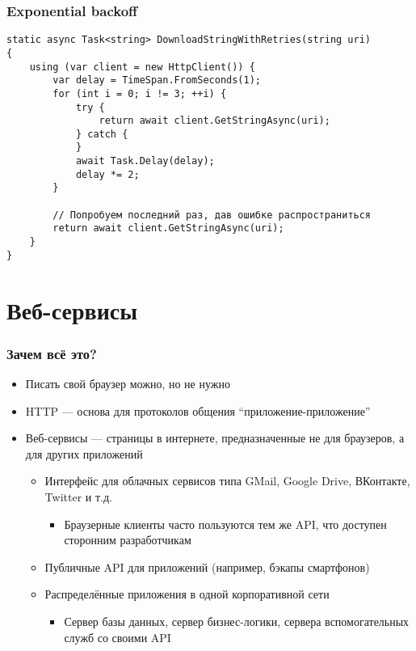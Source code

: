 \documentclass{../../slides-style}
\begin{document}
    \begin{frame}[fragile]
        \frametitle{Exponential backoff}
        \begin{footnotesize}
            \begin{verbatim}
static async Task<string> DownloadStringWithRetries(string uri)
{
    using (var client = new HttpClient()) {
        var delay = TimeSpan.FromSeconds(1);
        for (int i = 0; i != 3; ++i) {
            try {
                return await client.GetStringAsync(uri);
            } catch {
            }
            await Task.Delay(delay);
            delay *= 2;
        }

        // Попробуем последний раз, дав ошибке распространиться
        return await client.GetStringAsync(uri);
    }
}
            \end{verbatim}
        \end{footnotesize}
    \end{frame}

    \section{Веб-сервисы}

    \begin{frame}
        \frametitle{Зачем всё это?}
        \begin{itemize}
            \item Писать свой браузер можно, но не нужно
            \item HTTP --- основа для протоколов общения \enquote{приложение-приложение}
            \item Веб-сервисы --- страницы в интернете, предназначенные не для браузеров, а для других приложений
            \begin{itemize}
                \item Интерфейс для облачных сервисов типа GMail, Google Drive, ВКонтакте, Twitter и т.д.
                \begin{itemize}
                    \item Браузерные клиенты часто пользуются тем же API, что доступен сторонним разработчикам
                \end{itemize}
                \item Публичные API для приложений (например, бэкапы смартфонов)
                \item Распределённые приложения в одной корпоративной сети
                \begin{itemize}
                    \item Сервер базы данных, сервер бизнес-логики, сервера вспомогательных служб со своими API
                \end{itemize}
            \end{itemize}
        \end{itemize}
    \end{frame}
\end{document}
